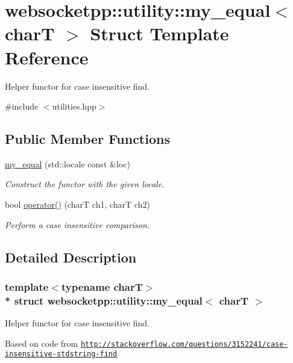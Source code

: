 \hypertarget{structwebsocketpp_1_1utility_1_1my__equal}{}\section{websocketpp\+:\+:utility\+:\+:my\+\_\+equal$<$ charT $>$ Struct Template Reference}
\label{structwebsocketpp_1_1utility_1_1my__equal}


Helper functor for case insensitive find.  




{\ttfamily \#include $<$utilities.\+hpp$>$}

\subsection*{Public Member Functions}
\begin{DoxyCompactItemize}
\item 
\hyperlink{structwebsocketpp_1_1utility_1_1my__equal_a8f03de886784304ffd39ed5de677af1f}{my\+\_\+equal} (std\+::locale const \&loc)
\begin{DoxyCompactList}\small\item\em Construct the functor with the given locale. \end{DoxyCompactList}\item 
bool \hyperlink{structwebsocketpp_1_1utility_1_1my__equal_a06b93db62003458703574e6421f9875f}{operator()} (charT ch1, charT ch2)
\begin{DoxyCompactList}\small\item\em Perform a case insensitive comparison. \end{DoxyCompactList}\end{DoxyCompactItemize}


\subsection{Detailed Description}
\subsubsection*{template$<$typename charT$>$\\*
struct websocketpp\+::utility\+::my\+\_\+equal$<$ char\+T $>$}

Helper functor for case insensitive find. 

Based on code from \href{http://stackoverflow.com/questions/3152241/case-insensitive-stdstring-find}{\tt http\+://stackoverflow.\+com/questions/3152241/case-\/insensitive-\/stdstring-\/find}

